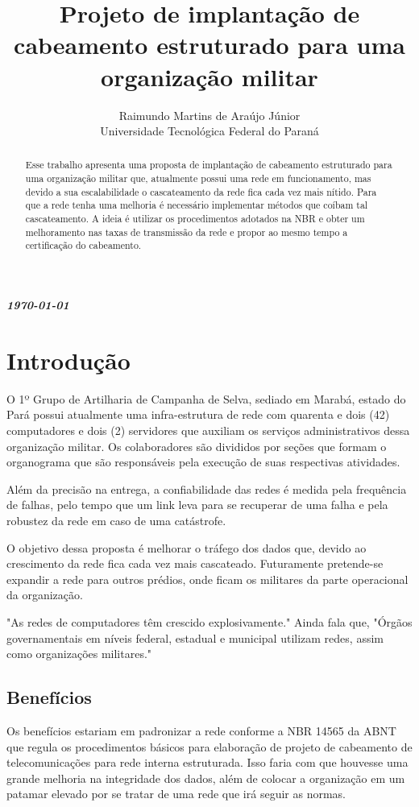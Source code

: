 \documentclass[12pt, a4paper]{article}
\title{Projeto de implantação de cabeamento estruturado para uma organização militar}
\author{Raimundo Martins de Araújo Júnior\\Universidade Tecnológica Federal do Paraná}
\begin{document}
	\maketitle
	\begin{abstract}
		Esse trabalho apresenta uma proposta de implantação de cabeamento estruturado para uma organização militar que, atualmente possui uma rede em funcionamento, mas devido a sua escalabilidade o cascateamento da rede fica cada vez mais nítido. Para que a rede tenha uma melhoria é necessário implementar métodos que coíbam tal cascateamento. A ideia é utilizar os procedimentos adotados na NBR e obter um melhoramento nas taxas de transmissão da rede e propor ao mesmo tempo a certificação do cabeamento. 
	\end{abstract}
\vspace{8cm}
\centerline{\textit{\textbf{\today}}}
\newpage
\tableofcontents
\newpage
\listoftables
\listoffigures
\newpage
	\section{Introdução}
	O 1º Grupo de Artilharia de Campanha de Selva, sediado em Marabá, estado do Pará possui atualmente uma infra-estrutura de rede com quarenta e dois (42) computadores e dois (2) servidores que auxiliam os serviços administrativos dessa organização militar. Os colaboradores são divididos por seções que formam o organograma que são responsáveis pela execução de suas respectivas atividades.
	\par
	\cite{fourozan10}Além da precisão na entrega, a confiabilidade das redes é medida pela frequência de falhas, pelo tempo que um link leva para se recuperar de uma falha e pela robustez da rede em caso de uma catástrofe.
	\par 
	O objetivo dessa proposta é melhorar o tráfego dos dados que, devido ao crescimento da rede fica cada vez mais cascateado. Futuramente pretende-se expandir a rede para outros prédios, onde ficam os militares da parte operacional da organização.
	\par
	\cite{comer}"As redes de computadores têm crescido explosivamente." \cite{comer} Ainda fala que, "Órgãos governamentais em níveis federal, estadual e municipal utilizam redes, assim como organizações militares."
	\subsection{Benefícios}
	Os benefícios estariam em padronizar a rede conforme a NBR 14565 da ABNT que regula os procedimentos básicos para elaboração de projeto de cabeamento de telecomunicações para rede interna estruturada. Isso faria com que houvesse uma grande melhoria na integridade dos dados, além de colocar a organização em um patamar elevado por se tratar de uma rede que irá seguir as normas.
\end{document}
